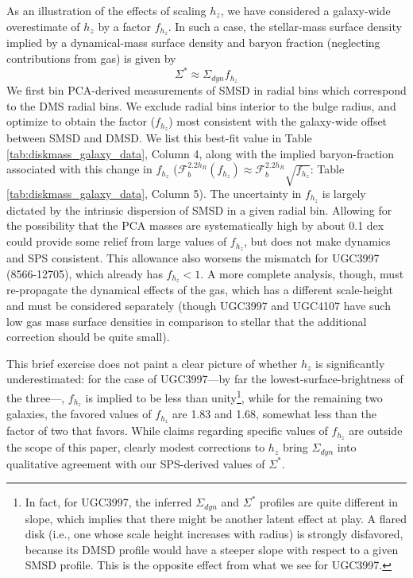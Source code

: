 As an illustration of the effects of scaling $h_z$, we have considered a galaxy-wide overestimate of $h_z$ by a factor $f_{h_z}$. In such a case, the stellar-mass surface density implied by a dynamical-mass surface density and baryon fraction (neglecting contributions from gas) is given by
%
\begin{equation}
    \Sigma^* \approx \Sigma_{dyn} f_{h_z}
\end{equation}
%
We first bin PCA-derived measurements of SMSD in radial bins which correspond to the DMS radial bins. We exclude radial bins interior to the bulge radius, and optimize to obtain the factor ($f_{h_z}$) most consistent with the galaxy-wide offset between SMSD and DMSD. We list this best-fit value in Table \ref{tab:diskmass_galaxy_data}, Column 4, along with the implied baryon-fraction associated with this change in $f_{h_z}$ ($\mathcal{F}_b^{2.2h_R}(f_{h_z}) \approx \mathcal{F}_b^{2.2h_R} \sqrt{f_{h_z}}$: Table \ref{tab:diskmass_galaxy_data}, Column 5). The uncertainty in $f_{h_z}$ is largely dictated by the intrinsic dispersion of SMSD in a given radial bin. Allowing for the possibility that the PCA masses are systematically high by about 0.1 dex could provide some relief from large values of $f_{h_z}$, but does not make dynamics and SPS consistent. This allowance also worsens the mismatch for UGC3997 (8566-12705), which already has $f_{h_z} < 1$. A more complete analysis, though, must re-propagate the dynamical effects of the gas, which has a different scale-height and must be considered separately (though UGC3997 and UGC4107 have such low gas mass surface densities in comparison to stellar that the additional correction should be quite small).

This brief exercise does not paint a clear picture of whether $h_z$ is significantly underestimated: for the case of UGC3997---by far the lowest-surface-brightness of the three---, $f_{h_z}$ is implied to be less than unity\footnote{In fact, for UGC3997, the inferred $\Sigma_{dyn}$ and $\Sigma^*$ profiles are quite different in slope, which implies that there might be another latent effect at play. A flared disk (i.e., one whose scale height increases with radius) is strongly disfavored, because its DMSD profile would have a steeper slope with respect to a given SMSD profile. This is the opposite effect from what we see for UGC3997.}, while for the remaining two galaxies, the favored values of $f_{h_z}$ are 1.83 and 1.68, somewhat less than the factor of two that \citet{aniyan_freeman_16} favors. While claims regarding specific values of $f_{h_z}$ are outside the scope of this paper, clearly modest corrections to $h_z$ bring $\Sigma_{dyn}$ into qualitative agreement with our SPS-derived values of $\Sigma^*$.

